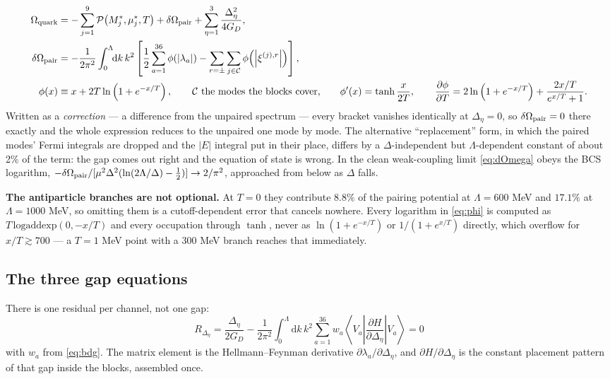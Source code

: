 \documentclass[11pt,a4paper]{article}
\newcommand{\Mstar}{M^{*}}
\newcommand{\mustar}{\mu^{*}}
\begin{document}
\begin{align}
\Omega_{\rm quark} &= -\sum_{j=1}^{9}\mathcal P\!\left(\Mstar_j,\mustar_j,T\right)
 + \delta\Omega_{\rm pair} + \sum_{\eta=1}^{3}\frac{\Delta_\eta^2}{4G_D},
\label{eq:Omegaquark}\\
\delta\Omega_{\rm pair} &= -\frac{1}{2\pi^2}\int_0^{\Lambda}\!\!\mathrm dk\,k^2
 \left[\frac12\sum_{a=1}^{36}\phi\!\left(|\lambda_a|\right)
 - \sum_{r=\pm}\sum_{j\in\mathcal C}
   \phi\!\left(\left|\xi^{(j),r}\right|\right)\right],
\label{eq:dOmega}\\
\phi(x) &\equiv x + 2T\ln\left(1+e^{-x/T}\right),%
\qquad\text{$\mathcal C$ the modes the blocks cover,}
\qquad \phi'(x) = \tanh\frac{x}{2T},
\qquad \frac{\partial\phi}{\partial T}
 = 2\ln\left(1+e^{-x/T}\right) + \frac{2x/T}{e^{x/T}+1}.
\label{eq:phi}
\end{align}
Written as a \emph{correction} --- a difference from the unpaired spectrum ---
every bracket vanishes identically at $\Delta_\eta=0$, so $\delta\Omega_{\rm
pair}=0$ there exactly and the whole expression reduces to the unpaired one
mode by mode. The alternative ``replacement'' form, in which the paired modes'
Fermi integrals are dropped and the $|E|$ integral put in their place, differs
by a $\Delta$-independent but $\Lambda$-dependent constant of about 2\% of the
term: the gap comes out right and the equation of state is wrong. In the clean
weak-coupling limit \eqref{eq:dOmega} obeys the BCS logarithm,
$-\delta\Omega_{\rm pair}/[\mu^2\Delta^2(\ln(2\Lambda/\Delta)-\tfrac12)]
\to 2/\pi^2$, approached from below as $\Delta$ falls.

\textbf{The antiparticle branches are not optional.} At $T=0$ they contribute
$8.8\%$ of the pairing potential at $\Lambda=600$ MeV and $17.1\%$ at
$\Lambda=1000$ MeV, so omitting them is a cutoff-dependent error that cancels
nowhere. Every logarithm in \eqref{eq:phi} is computed as
$T\,\mathrm{logaddexp}(0,-x/T)$ and every occupation through $\tanh$, never as
$\ln(1+e^{-x/T})$ or $1/(1+e^{x/T})$ directly, which overflow for
$x/T\gtrsim700$ --- a $T=1$ MeV point with a $300$ MeV branch reaches that
immediately.

\subsection{The three gap equations}

There is one residual per channel, not one gap:
\begin{equation}
\boxed{\;
R_{\Delta_\eta} = \frac{\Delta_\eta}{2G_D}
 - \frac{1}{2\pi^2}\int_0^{\Lambda}\!\!\mathrm dk\,k^2\sum_{a=1}^{36}
 w_a \left\langle V_a\left|
 \frac{\partial H}{\partial\Delta_\eta}
 \right|V_a\right\rangle = 0\;}
\label{eq:gapeq}
\end{equation}
with $w_a$ from \eqref{eq:bdg}. The matrix element is the Hellmann--Feynman
derivative $\partial\lambda_a/\partial\Delta_\eta$, and
$\partial H/\partial\Delta_\eta$ is the constant placement pattern of that gap
inside the blocks, assembled once.
\end{document}
